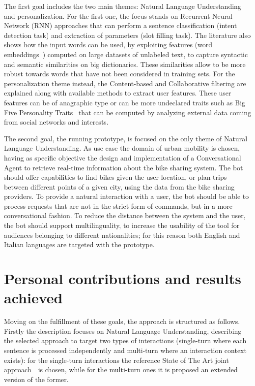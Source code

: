 The first goal includes the two main themes: Natural Language Understanding and personalization. For the first one, the focus stands on Recurrent Neural Network (RNN) approaches that can perform a sentence classification (intent detection task) and extraction of parameters (slot filling task). The literature also shows how the input words can be used, by exploiting features (word embeddings~\cite{pennington2014glove}) computed on large datasets of unlabeled text, to capture syntactic and semantic similarities on big dictionaries. These similarities allow to be more robust towards words that have not been considered in training sets. For the personalization theme instead, the Content-based and Collaborative filtering are explained along with available methods to extract user features. These user features can be of anagraphic type or can be more undeclared traits such as Big Five Personality Traits~\cite{goldberg1993structure} that can be computed by analyzing external data coming from social networks and interests.

The second goal, the running prototype, is focused on the only theme of Natural Language Understanding. As use case the domain of urban mobility is chosen, having as specific objective the design and implementation of a Conversational Agent to retrieve real-time information about the bike sharing system. The bot should offer capabilities to find bikes given the user location, or plan trips between different points of a given city, using the data from the bike sharing providers. To provide a natural interaction with a user, the bot should be able to process requests that are not in the strict form of commands, but in a more conversational fashion. To reduce the distance between the system and the user, the bot should support multilinguality, to increase the usability of the tool for audiences belonging to different nationalities; for this reason both English and Italian languages are targeted with the prototype.

\section*{Personal contributions and results achieved}
Moving on the fulfillment of these goals, the approach is structured as follows. Firstly the description focuses on Natural Language Understanding, describing the selected approach to target two types of interactions (single-turn where each sentence is processed independently and multi-turn where an interaction context exists): for the single-turn interactions the reference State of The Art joint approach~\cite{liu2016attention}\ is chosen, while for the multi-turn ones  it is proposed an extended version of the former.

